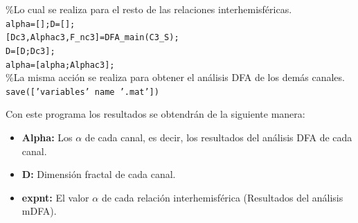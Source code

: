 \documentclass[letterpaper,titlepage,12pt,draft]{report}
\begin{document}
\textcolor[cmyk]{1,0,1,0}{\%Lo cual se realiza para el resto de las relaciones interhemisf\'ericas.}\\

{\tt \setlength{\parindent}{0pt}alpha=[];D=[];\\}
{\tt \setlength{\parindent}{0pt}[Dc3,Alphac3,F\_nc3]=DFA\_main(C3\_S);\\
D=[D;Dc3];\\
alpha=[alpha;Alphac3];\\}
\textcolor[cmyk]{1,0,1,0}{\%La misma acci\'on se realiza para obtener el an\'alisis DFA de los dem\'as canales.}\\

{\tt \setlength{\parindent}{0pt}save([\textcolor[cmyk]{0,1,0,0}{'variables'} name \textcolor[cmyk]{0,1,0,0}{'.mat'}])\\}

Con este programa los resultados se obtendr\'an de la siguiente manera:
\begin{itemize}
\item {\bf Alpha:} Los $\alpha$ de cada canal, es decir, los resultados del an\'alisis DFA de cada canal.
\item {\bf D:} Dimensi\'on fractal de cada canal.
\item {\bf expnt:} El valor $\alpha$ de cada relaci\'on interhemisf\'erica (Resultados del an\'alisis mDFA).
\end{itemize} 


\end{document}
